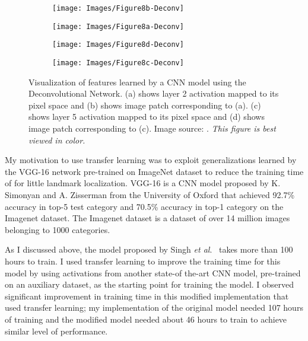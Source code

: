 \documentclass [11pt,letterpaper ,twoside ,openany ]{report}
\begin{document}
    \begin{figure}[t]
    \centering
        \begin{subfigure}[b]{0.23\linewidth}
            \centering
            \texttt{[image: Images/Figure8b-Deconv]}
            \caption{}
        \end{subfigure}    
        \begin{subfigure}[b]{0.23\linewidth}
            \centering
            \texttt{[image: Images/Figure8a-Deconv]}
            \caption{}
        \end{subfigure}
        \begin{subfigure}[b]{0.23\linewidth}
            \centering
            \texttt{[image: Images/Figure8d-Deconv]}
            \caption{}
        \end{subfigure}                
        \begin{subfigure}[b]{0.23\linewidth}
            \centering
            \texttt{[image: Images/Figure8c-Deconv]}
            \caption{}
        \end{subfigure}
        \caption{Visualization of features learned by a CNN model using the Deconvolutional Network. (a) shows layer 2 activation mapped to its pixel space and (b) shows image patch corresponding to (a). (c) shows layer 5 activation mapped to its pixel space and (d) shows image patch corresponding to (c). Image source: \cite{zeiler2014visualizing}. \textit{This figure is best viewed in color.}}
        \label{fig:devonv}
    \end{figure}

    My motivation to use transfer learning was to exploit generalizations learned by the VGG-16 network \cite{simonyan2014very} pre-trained on ImageNet \cite{russakovsky2015imagenet} dataset to reduce the training time of for little landmark localization. VGG-16 \cite{simonyan2014very} is a CNN model proposed by K. Simonyan and A. Zisserman from the University of Oxford that achieved 92.7\% accuracy in top-5 test category and 70.5\% accuracy in top-1 category on the Imagenet dataset. The Imagenet dataset \cite{russakovsky2015imagenet} is a dataset of over 14 million images belonging to 1000 categories.

    As I discussed above, the model proposed by Singh \textit{et al}.\ \cite{Singh_2016_CVPR} takes more than 100 hours to train. I used transfer learning to improve the training time for this model by using activations from another state-of the-art CNN model, pre-trained on an auxiliary dataset, as the starting point for training the model. I observed significant improvement in training time in this modified implementation that used transfer learning; my implementation of the original model needed 107 hours of training and the modified model needed about 46 hours to train to achieve similar level of performance.
\end{document}
